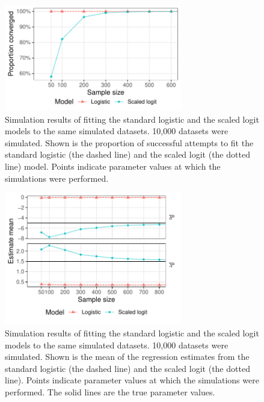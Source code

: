 \begin{figure}[htp]
	\centering
	\includegraphics[width=0.69\textwidth]{../logistic-plot/vary_nsam.pdf}
	\caption{
	Simulation results of fitting the standard logistic and the scaled logit models to the same simulated datasets. 10,000 datasets were simulated. Shown is the proportion of successful attempts to fit the standard logistic (the dashed line) and the scaled logit (the dotted line) model. Points indicate parameter values at which the simulations were performed.
	}
	\label{SclrConv}
\end{figure}

\begin{figure}[htp]
	\centering
	\includegraphics[width=0.69\textwidth]{../logistic-plot/vary_nsam_mean.pdf}
	\caption{
	Simulation results of fitting the standard logistic and the scaled logit models to the same simulated datasets. 10,000 datasets were simulated. Shown is the mean of the regression estimates from the standard logistic (the dashed line) and the scaled logit (the dotted line). Points indicate parameter values at which the simulations were performed. The solid lines are the true parameter values.
	}
	\label{SclrMean}
\end{figure}
